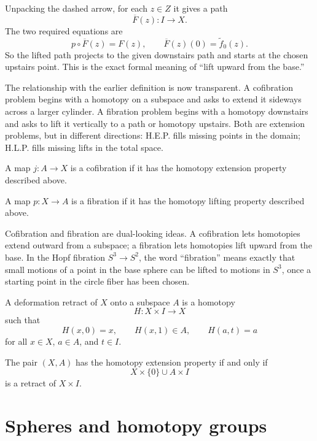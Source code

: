 Unpacking the dashed arrow, for each \(z\in Z\) it gives a path
\[
  \overline F(z):I\to X.
\]
The two required equations are
\[
  p\circ \overline F(z)=F(z),
  \qquad
  \overline F(z)(0)=\widetilde f_0(z).
\]
So the lifted path projects to the given downstairs path and starts at the chosen upstairs point.  This is the exact formal meaning of ``lift upward from the base.''

The relationship with the earlier definition is now transparent.  A cofibration problem begins with a homotopy on a subspace and asks to extend it sideways across a larger cylinder.  A fibration problem begins with a homotopy downstairs and asks to lift it vertically to a path or homotopy upstairs.  Both are extension problems, but in different directions: H.E.P. fills missing points in the domain; H.L.P. fills missing lifts in the total space.

\begin{definition}
A map \(j:A\to X\) is a cofibration if it has the homotopy extension property described above.
\end{definition}

\begin{definition}
A map \(p:X\to A\) is a fibration if it has the homotopy lifting property described above.
\end{definition}

\begin{remark}
Cofibration and fibration are dual-looking ideas.  A cofibration lets homotopies extend outward from a subspace; a fibration lets homotopies lift upward from the base.  In the Hopf fibration \(S^3\to S^2\), the word ``fibration'' means exactly that small motions of a point in the base sphere can be lifted to motions in \(S^3\), once a starting point in the circle fiber has been chosen.
\end{remark}

\begin{definition}
A deformation retract of \(X\) onto a subspace \(A\) is a homotopy
\[
  H:X\times I\to X
\]
such that
\[
  H(x,0)=x,\qquad H(x,1)\in A,\qquad H(a,t)=a
\]
for all \(x\in X\), \(a\in A\), and \(t\in I\).
\end{definition}

\begin{proposition}
The pair \((X,A)\) has the homotopy extension property if and only if
\[
  X\times\{0\}\cup A\times I
\]
is a retract of \(X\times I\).
\end{proposition}

\section{Spheres and homotopy groups}

